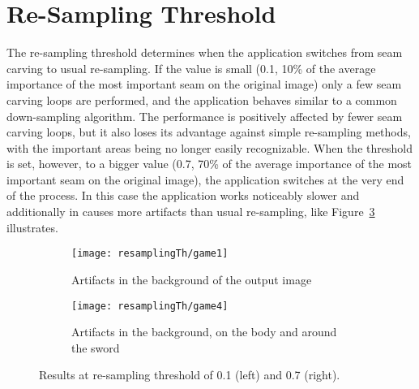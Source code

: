 \documentclass[draft,final]{vutinfth} %
\begin{document}
	\section{Re-Sampling Threshold}
	\label{res:resampling}
	The re-sampling threshold determines when the application switches from seam carving to usual re-sampling. 
	If the value is small (0.1, 10\% of the average importance of the most important seam on the original image) only a few seam carving loops are performed, and the application behaves similar to a common down-sampling algorithm.
	The performance is positively affected by fewer seam carving loops, but it also loses its advantage against simple re-sampling methods, with the important areas being no longer easily recognizable.
	When the threshold is set, however, to a bigger value (0.7, 70\% of the average importance of the most important seam on the original image), the application switches at the very end of the process.
	In this case the application works noticeably slower and additionally in causes more artifacts than usual re-sampling, like Figure~\ref{fig:res} illustrates.
	\begin{figure}[H]
		\centering
		\begin{subfigure}[Bt]{0.45\columnwidth}
			\centering
			\texttt{[image: resamplingTh/game1]}
			\caption{Artifacts in the background of the output image}
			\label{fig:res:th1}
		\end{subfigure}
		\begin{subfigure}[Bt]{0.45\columnwidth}
			\centering
			\texttt{[image: resamplingTh/game4]}
			\caption{Artifacts in the background, on the body and around the sword}
			\label{fig:res:th2}
		\end{subfigure}
		\caption{Results at re-sampling threshold of 0.1 (left) and 0.7 (right).}
		\label{fig:res}
	\end{figure}  
\end{document}
